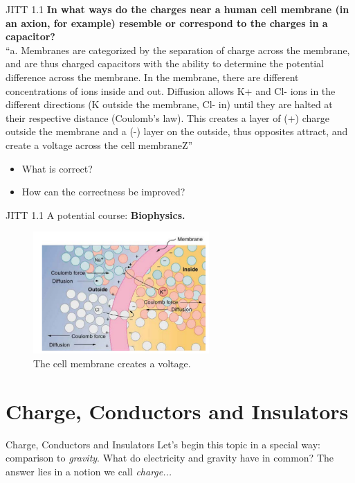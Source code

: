 \documentclass{beamer}
\begin{document}
\begin{frame}{JITT 1.1}
\small
\textbf{In what ways do the charges near a human cell membrane (in an axion, for example) resemble or correspond to the charges in a capacitor?} \\
``a. Membranes are categorized by the separation of charge across the membrane, and are thus charged capacitors with the ability to determine the potential difference across the membrane. In the membrane, there are different concentrations of ions inside and out. Diffusion allows K+ and Cl- ions in the different directions (K outside the membrane, Cl- in) until they are halted at their respective distance (Coulomb’s law). This creates a layer of (+) charge outside the membrane and a  (-) layer on the outside, thus opposites attract, and create a voltage across the cell membraneZ''
\begin{itemize}
\item What is correct?
\item How can the correctness be improved?
\end{itemize}
\end{frame}

\begin{frame}{JITT 1.1}
A potential course: \textbf{Biophysics.}
\begin{figure}
\centering
\includegraphics[width=0.6\textwidth]{figures/membrane.png}
\caption{\label{fig:membrane} The cell membrane creates a voltage.}
\end{figure}
\end{frame}

\section{Charge, Conductors and Insulators}

\begin{frame}{Charge, Conductors and Insulators}
Let's begin this topic in a special way: comparison to \textit{gravity}.  What do electricity and gravity have in common?  The answer lies in a notion we call \textit{charge...}
\end{frame}
\end{document}

